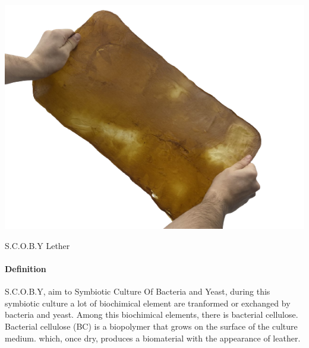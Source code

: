 \begin{marginfigure}
    \centering
    \includegraphics{images/kombucha-removebg-preview-removebg-preview.png}    
    \caption{S.C.O.B.Y Lether}
    \label{fig:S.C.O.B.Y Lether}
\end{marginfigure}

\paragraph[short]{Definition } 
S.C.O.B.Y, aim to Symbiotic Culture Of Bacteria and Yeast, during this symbiotic culture a lot of biochimical element are tranformed or exchanged by bacteria and yeast.
Among this biochimical elements, there is bacterial cellulose. Bacterial cellulose (BC) is a biopolymer that grows on the surface of the culture medium. which, once dry, produces a biomaterial with the appearance of leather. 

